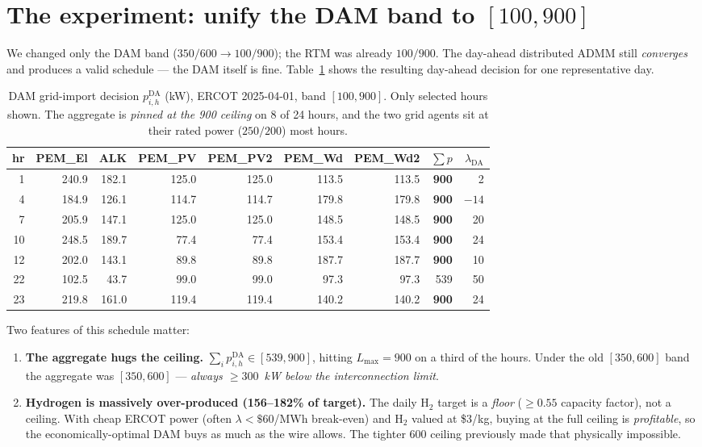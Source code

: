 \documentclass[11pt, letterpaper]{article}
\begin{document}
\section{The experiment: unify the DAM band to $[100,900]$}
We changed only the DAM band ($350/600\to100/900$); the RTM was already $100/900$. The day-ahead
distributed ADMM still \emph{converges} and produces a valid schedule --- the DAM itself is fine.
Table~\ref{tab:dam} shows the resulting day-ahead decision for one representative day.

\begin{table}[H]\centering\small
\caption{DAM grid-import decision $p^{\mathrm{DA}}_{i,h}$ (kW), ERCOT 2025-04-01, band $[100,900]$.
Only selected hours shown. The aggregate is \emph{pinned at the 900 ceiling} on 8 of 24 hours, and
the two grid agents sit at their rated power ($250/200$) most hours.}
\label{tab:dam}
\begin{tabular}{r rrrrrr r r}
\toprule
hr & PEM\_El & ALK & PEM\_PV & PEM\_PV2 & PEM\_Wd & PEM\_Wd2 & $\sum p$ & $\lambda_{\mathrm{DA}}$\\
\midrule
 1 & 240.9 & 182.1 & 125.0 & 125.0 & 113.5 & 113.5 & \textbf{900} & 2\\
 4 & 184.9 & 126.1 & 114.7 & 114.7 & 179.8 & 179.8 & \textbf{900} & $-14$\\
 7 & 205.9 & 147.1 & 125.0 & 125.0 & 148.5 & 148.5 & \textbf{900} & 20\\
10 & 248.5 & 189.7 &  77.4 &  77.4 & 153.4 & 153.4 & \textbf{900} & 24\\
12 & 202.0 & 143.1 &  89.8 &  89.8 & 187.7 & 187.7 & \textbf{900} & 10\\
22 & 102.5 &  43.7 &  99.0 &  99.0 &  97.3 &  97.3 & 539 & 50\\
23 & 219.8 & 161.0 & 119.4 & 119.4 & 140.2 & 140.2 & \textbf{900} & 24\\
\bottomrule
\end{tabular}
\end{table}

Two features of this schedule matter:
\begin{enumerate}[nosep]
\item \textbf{The aggregate hugs the ceiling.} $\sum_i p^{\mathrm{DA}}_{i,h}\in[539,900]$, hitting
$L_{\max}=900$ on a third of the hours. Under the old $[350,600]$ band the aggregate was
$[350,600]$ --- \emph{always $\ge300$~kW below the interconnection limit}.
\item \textbf{Hydrogen is massively over-produced (156--182\% of target).} The daily H$_2$ target is
a \emph{floor} ($\ge0.55$ capacity factor), not a ceiling. With cheap ERCOT power (often
$\lambda<\$60$/MWh break-even) and H$_2$ valued at \$3/kg, buying at the full ceiling is
\emph{profitable}, so the economically-optimal DAM buys as much as the wire allows. The tighter
$600$ ceiling previously made that physically impossible.
\end{enumerate}
\end{document}
